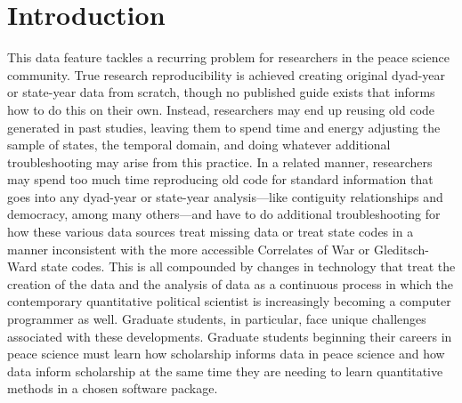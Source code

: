 \documentclass[
  11pt,
]{article}
\begin{document}
\vskip -8.5pt




\setlength{\parindent}{16pt}
\setlength{\parskip}{0pt}

\hypertarget{introduction}{%
\section{Introduction}\label{introduction}}

This data feature tackles a recurring problem for researchers in the peace science community. True research reproducibility is achieved creating original dyad-year or state-year data from scratch, though no published guide exists that informs how to do this on their own. Instead, researchers may end up reusing old code generated in past studies, leaving them to spend time and energy adjusting the sample of states, the temporal domain, and doing whatever additional troubleshooting may arise from this practice. In a related manner, researchers may spend too much time reproducing old code for standard information that goes into any dyad-year or state-year analysis---like contiguity relationships and democracy, among many others---and have to do additional troubleshooting for how these various data sources treat missing data or treat state codes in a manner inconsistent with the more accessible Correlates of War or Gleditsch-Ward state codes. This is all compounded by changes in technology that treat the creation of the data and the analysis of data as a continuous process in which the contemporary quantitative political scientist is increasingly becoming a computer programmer as well. Graduate students, in particular, face unique challenges associated with these developments. Graduate students beginning their careers in peace science must learn how scholarship informs data in peace science and how data inform scholarship at the same time they are needing to learn quantitative methods in a chosen software package.
\end{document}

